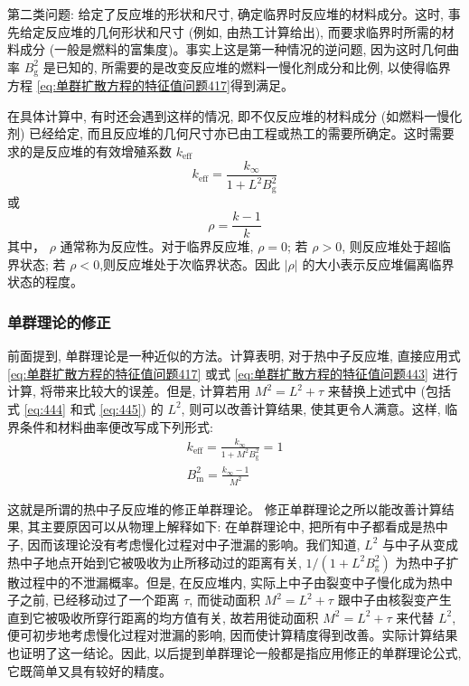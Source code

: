 \documentclass{Sichuan Normal University}
\begin{document}
第二类问题: 给定了反应堆的形状和尺寸, 确定临界时反应堆的材料成分。这时, 事先给定反应堆的几何形状和尺寸 (例如, 由热工计算给出), 而要求临界时所需的材料成分 (一般是燃料的富集度)。事实上这是第一种情况的逆问题, 因为这时几何曲率 $B_{\mathrm{g}}^2$ 是已知的, 所需要的是改变反应堆的燃料一慢化剂成分和比例, 以使得临界方程 \eqref{eq:单群扩散方程的特征值问题417}得到满足。

在具体计算中, 有时还会遇到这样的情况, 即不仅反应堆的材料成分 (如燃料一慢化剂) 已经给定, 而且反应堆的几何尺寸亦已由工程或热工的需要所确定。这时需要求的是反应堆的有效增殖系数 $k_{\mathrm{eff}}$
\begin{equation}
k_{\mathrm{eff}}=\frac{k_{\infty}}{1+L^2 B_{\mathrm{g}}^2}
\end{equation}
或
\begin{equation}
\rho=\frac{k-1}{k}
\end{equation}
其中， $\rho$ 通常称为反应性。对于临界反应堆, $\rho=0$; 若 $\rho>0$, 则反应堆处于超临界状态; 若 $\rho<0$,则反应堆处于次临界状态。因此 $|\rho|$ 的大小表示反应堆偏离临界状态的程度。
\subsubsection*{单群理论的修正}
前面提到, 单群理论是一种近似的方法。计算表明, 对于热中子反应堆, 直接应用式 \eqref{eq:单群扩散方程的特征值问题417} 或式 \eqref{eq:单群扩散方程的特征值问题443} 进行计算, 将带来比较大的误差。但是, 计算若用 $M^2=L^2+\tau$ 来替换上述式中 (包括式 \eqref{eq:444} 和式 \eqref{eq:445}) 的 $L^2$, 则可以改善计算结果, 使其更令人满意。这样, 临界条件和材料曲率便改写成下列形式:
\begin{equation}
\begin{gathered}
k_{\mathrm{eff}}=\frac{k_{\infty}}{1+M^2 B_{\mathrm{g}}^2}=1 \\
B_{\mathrm{m}}^2=\frac{k_{\infty}-1}{M^2}
\end{gathered}
\end{equation}

这就是所谓的热中子反应堆的修正单群理论。
修正单群理论之所以能改善计算结果, 其主要原因可以从物理上解释如下: 在单群理论中, 把所有中子都看成是热中子, 因而该理论没有考虑慢化过程对中子泄漏的影响。我们知道, $L^2$ 与中子从变成热中子地点开始到它被吸收为止所移动过的距离有关, $1 /\left(1+L^2 B_{\mathrm{g}}^2\right)$ 为热中子扩散过程中的不泄漏概率。但是, 在反应堆内, 实际上中子由裂变中子慢化成为热中子之前, 已经移动过了一个距离 $\tau$, 而徙动面积 $M^2=L^2+\tau$ 跟中子由核裂变产生直到它被吸收所穿行距离的均方值有关, 故若用徙动面积 $M^2=L^2+\tau$ 来代替 $L^2$, 便可初步地考虑慢化过程对泄漏的影响, 因而使计算精度得到改善。实际计算结果也证明了这一结论。因此, 以后提到单群理论一般都是指应用修正的单群理论公式, 它既简单又具有较好的精度。
\end{document}
